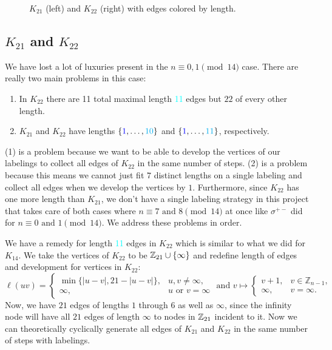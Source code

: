 \begin{figure}[H]
\begin{center}
\begin{tikzpicture}[scale=2,
        dot/.style={circle, fill=black, minimum size=2pt, inner sep=0pt},
        lbl/.style={draw=none, fill=none, inner sep=0pt, anchor=center}
      ]
      \end{tikzpicture}
    \end{center}
    \caption{$K_{21}$ (left) and $K_{22}$ (right) with edges colored by length.}
    \label{fig:K21K22colored}
  \end{figure}
  \subsection{$K_{21}$ and $K_{22}$}\label{sec:7,8constrK21K22}
  We have lost a lot of luxuries present in the $n\equiv 0,1\pmod{14}$ case. There are really two main problems in this case:
  \begin{enumerate}
    \item In $K_{22}$ there are 11 total maximal length \textcolor{cyan}{11} edges but $22$ of every other length.
    \item $K_{21}$ and $K_{22}$ have lengths $\{\textcolor{blue}{1},\hdots,\textcolor{cyan}{10}\}$ and $\{\textcolor{blue}{1},\hdots,\textcolor{cyan}{11}\}$, respectively.
  \end{enumerate}
  (1) is a problem because we want to be able to develop the vertices of our labelings to collect all edges of $K_{22}$ in the same number of steps. (2) is a problem because this means we cannot just fit $7$ distinct lengths on a single labeling and collect all edges when we develop the vertices by $1$. Furthermore, since $K_{22}$ has one more length than $K_{21}$, we don't have a single labeling strategy in this project that takes care of both cases where $n\equiv 7\text{ and }8\pmod{14}$ at once like $\sigma^{+-}$ did for $n\equiv 0\text{ and }1\pmod{14}$. We address these problems in order.
  
  We have a remedy for length \textcolor{cyan}{11} edges in $K_{22}$ which is similar to what we did for $K_{14}$. We take the vertices of $K_{22}$ to be $\ZZ_{21}\cup\{\infty\}$ and redefine length of edges and development for vertices in $K_{22}$:
  $$\ell(uv)=\begin{cases}\min\{|u-v|,21-|u-v|\}, & u,v\neq \infty, \\ \infty, & u\text{ or }v=\infty \end{cases} \text{ and }v\mapsto 
  \begin{cases}
    v+1,&v\in\mathbb{Z}_{n-1},\\
    \infty,        &v=\infty.
  \end{cases}$$
  Now, we have $21$ edges of lengths $1$ through $6$ as well as $\infty$, since the infinity node will have all $21$ edges of length $\infty$ to nodes in $\ZZ_{21}$ incident to it. Now we can theoretically cyclically generate all edges of $K_{21}$ and $K_{22}$ in the same number of steps with labelings.

